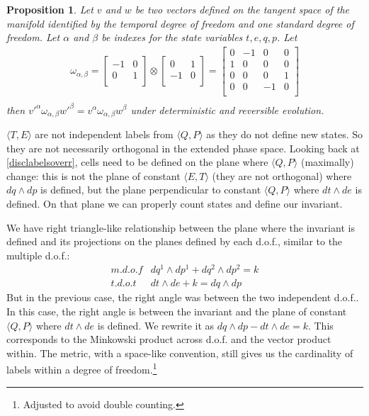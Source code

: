 \documentclass[twocolumn,floatfix,nofootinbib]{revtex4}   %
\theoremstyle{theorem}
\newtheorem{prop}[thm]{Proposition}
\theoremstyle{definition}
\begin{document}
\begin{prop}\label{tdofInvariant}
Let $v$ and $w$ be two vectors defined on the tangent space of the manifold identified by the temporal degree of freedom and one standard degree of freedom. Let $\alpha$ and $\beta$ be indexes for the state variables $t, e, q, p$. Let
\begin{align*}
\omega_{\alpha, \beta} =  \left[
  \begin{array}{cc}
    -1 & 0 \\
    0 & 1 \\
  \end{array}
\right] \otimes \left[
  \begin{array}{cc}
    0 & 1 \\
    -1 & 0 \\
  \end{array}
\right]
= \left[
  \begin{array}{cccc}
    0 & -1 & 0 & 0 \\
    1 & 0 & 0 & 0 \\
    0 & 0 & 0 & 1 \\
    0 & 0 & -1 & 0 \\
  \end{array}
\right] \\
\end{align*}
then $v'^{\alpha} \omega_{\alpha, \beta} w'^{\beta}=v^{\alpha} \omega_{\alpha, \beta} w^{\beta}$ under deterministic and reversible evolution.
\end{prop}

$\langle T, E \rangle$ are not independent labels from $\langle Q, P \rangle$ as they do not define new states. So they are not necessarily orthogonal in the extended phase space. Looking back at \ref{disclabelsoverr}, cells need to be defined on the plane where $\langle Q, P \rangle$ (maximally) change: this is not the plane of constant $\langle E, T \rangle$ (they are not orthogonal) where $dq \wedge dp$ is defined, but the plane perpendicular to constant $\langle Q, P \rangle$ where $dt \wedge de$ is defined. On that plane we can properly count states and define our invariant.

We have right triangle-like relationship between the plane where the invariant is defined and its projections on the planes defined by each d.o.f., similar to the multiple d.o.f.:
\begin{align*}
m.d.o.f &dq^1 \wedge dp^1 + dq^2 \wedge dp^2 = k \\
t.d.o.t &dt \wedge de + k = dq \wedge dp
\end{align*}
But in the previous case, the right angle was between the two independent d.o.f.. In this case, the right angle is between the invariant and the plane of constant $\langle Q, P \rangle$ where $dt \wedge de$ is defined. We rewrite it as $dq \wedge dp - dt \wedge de = k$. This corresponds to the Minkowski product across d.o.f. and the vector product within. The metric, with a space-like convention, still gives us the cardinality of labels within a degree of freedom.\footnote{Adjusted to avoid double counting.}
\end{document}
